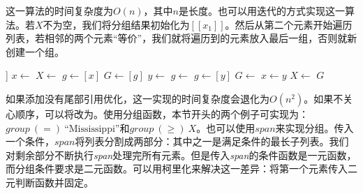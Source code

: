 \documentclass[b5paper]{ctexart}
\begin{document}
\be
{}
\ee

这一算法的时间复杂度为$O(n)$，其中$n$是长度。也可以用迭代的方式实现这一算法。若$X$不为空，我们将分组结果初始化为$[[x_1]]$。然后从第二个元素开始遍历列表，若相邻的两个元素“等价”，我们就将遍历到的元素放入最后一组，否则就新创建一个组。

\begin{algorithmic}[1]
    \State \Return [[\ ]]
  \EndIf
  \State $x \gets$ 
  \State $X \gets$ 
  \State $g \gets [x]$
  \State $G \gets [g]$
    \State $y \gets$ 
      \State $g \gets $ 
    \Else
      \State $g \gets [y]$
      \State $G \gets$ 
    \EndIf
    \State $x \gets y$
    \State $X \gets$ 
  \EndWhile
  \State \Return $G$
\EndFunction
\end{algorithmic}

如果添加没有尾部引用优化，这一实现的时间复杂度会退化为$O(n^2)$。如果不关心顺序，可以将改为。使用分组函数，本节开头的两个例子可实现为：$\textit{group}\ (=)\ \text{``Mississippi''}$和$\textit{group}\ (\geq)\ X$。也可以使用$span$来实现分组。传入一个条件，$span$将列表分割成两部分：其中之一是满足条件的最长子列表。我们对剩余部分不断执行\textit{span}处理完所有元素。但是传入\textit{span}的条件函数是一元函数，而分组条件要求是二元函数。可以用柯里化来解决这一差异：将第一个元素传入二元判断函数并固定。

\be
{}
\ee
\end{document}
